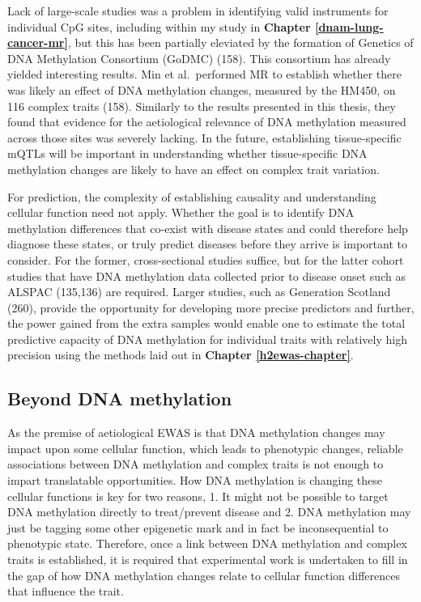 \documentclass[11pt,oneside]{bristolthesis}
\begin{document}
Lack of large-scale studies was a problem in identifying valid instruments for individual CpG sites, including within my study in \textbf{Chapter \ref{dnam-lung-cancer-mr}}, but this has been partially eleviated by the formation of Genetics of DNA Methylation Consortium (GoDMC) (158). This consortium has already yielded interesting results. Min et al.~performed MR to establish whether there was likely an effect of DNA methylation changes, measured by the HM450, on 116 complex traits (158). Similarly to the results presented in this thesis, they found that evidence for the aetiological relevance of DNA methylation measured across those sites was severely lacking. In the future, establishing tissue-specific mQTLs will be important in understanding whether tissue-specific DNA methylation changes are likely to have an effect on complex trait variation.

For prediction, the complexity of establishing causality and understanding cellular function need not apply. Whether the goal is to identify DNA methylation differences that co-exist with disease states and could therefore help diagnose these states, or truly predict diseases before they arrive is important to consider. For the former, cross-sectional studies suffice, but for the latter cohort studies that have DNA methylation data collected prior to disease onset such as ALSPAC (135,136) are required. Larger studies, such as Generation Scotland (260), provide the opportunity for developing more precise predictors and further, the power gained from the extra samples would enable one to estimate the total predictive capacity of DNA methylation for individual traits with relatively high precision using the methods laid out in \textbf{Chapter \ref{h2ewas-chapter}}.

\hypertarget{beyond-dnam}{%
\subsection{Beyond DNA methylation}\label{beyond-dnam}}

As the premise of aetiological EWAS is that DNA methylation changes may impact upon some cellular function, which leads to phenotypic changes, reliable associations between DNA methylation and complex traits is not enough to impart translatable opportunities. How DNA methylation is changing these cellular functions is key for two reasons, 1. It might not be possible to target DNA methylation directly to treat/prevent disease and 2. DNA methylation may just be tagging some other epigenetic mark and in fact be inconsequential to phenotypic state. Therefore, once a link between DNA methylation and complex traits is established, it is required that experimental work is undertaken to fill in the gap of how DNA methylation changes relate to cellular function differences that influence the trait.
\end{document}
